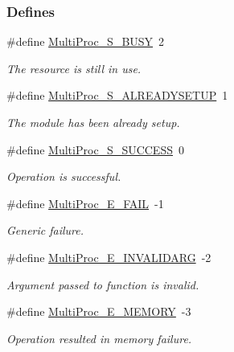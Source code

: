 \subsubsection*{Defines}
\begin{DoxyCompactItemize}
\item 
\#define \hyperlink{_multi_proc_8h_a419e76c904cc23e3ab274bd49d4ba2f0}{MultiProc\_\-S\_\-BUSY}~2
\begin{DoxyCompactList}\small\item\em The resource is still in use. \item\end{DoxyCompactList}\item 
\#define \hyperlink{_multi_proc_8h_a67c6af51e4eee99a2e57b498ba943366}{MultiProc\_\-S\_\-ALREADYSETUP}~1
\begin{DoxyCompactList}\small\item\em The module has been already setup. \item\end{DoxyCompactList}\item 
\#define \hyperlink{_multi_proc_8h_a88ef69134ed8907ec46443a8c5445acd}{MultiProc\_\-S\_\-SUCCESS}~0
\begin{DoxyCompactList}\small\item\em Operation is successful. \item\end{DoxyCompactList}\item 
\#define \hyperlink{_multi_proc_8h_ac3e4ff7eac6f0fe38b97b1ca086ea1c6}{MultiProc\_\-E\_\-FAIL}~-\/1
\begin{DoxyCompactList}\small\item\em Generic failure. \item\end{DoxyCompactList}\item 
\#define \hyperlink{_multi_proc_8h_a898d3875868db40c49e5c28100c2accb}{MultiProc\_\-E\_\-INVALIDARG}~-\/2
\begin{DoxyCompactList}\small\item\em Argument passed to function is invalid. \item\end{DoxyCompactList}\item 
\#define \hyperlink{_multi_proc_8h_aaa847e4fc5b581994dff79bcfc859bce}{MultiProc\_\-E\_\-MEMORY}~-\/3
\begin{DoxyCompactList}\small\item\em Operation resulted in memory failure. \item\end{DoxyCompactList}\item 

\end{DoxyCompactItemize}
